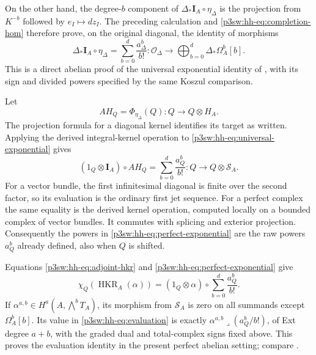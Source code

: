 \documentclass[11pt]{article}
\numberwithin{equation}{section}
\begin{document}
On the other hand, the degree-\(b\) component of
\(\Delta_*\mathbf I_A\circ\eta_\Delta\) is the projection from
\(K^{-b}\) followed by \(e_I\mapsto dz_I\).  The preceding
calculation and \eqref{p3sw:hh-eq:completion-hom} therefore prove,
on the original diagonal, the identity of morphisms
\begin{equation}
 \Delta_*\mathbf I_A\circ\eta_\Delta
    =\sum_{b=0}^d\frac{a_\Delta^b}{b!}:
       \mathcal O_\Delta\longrightarrow
                   \bigoplus_{b=0}^d\Delta_*\Omega_A^b[b].
\label{p3sw:hh-eq:universal-exponential}
\end{equation}
This is a direct abelian proof of the universal exponential identity
of \cite[Proposition~4.4]{P3HHCaldararuII}, with its sign and divided
powers specified by the same Koszul comparison.

Let
\[
 AH_Q=\Phi_{\eta_\Delta}(Q):Q\longrightarrow Q\otimes H_A .
\]
The projection formula for a diagonal kernel identifies its target
as written.  Applying the derived integral-kernel operation to
\eqref{p3sw:hh-eq:universal-exponential} gives
\begin{equation}
 (1_Q\otimes\mathbf I_A)\circ AH_Q
      =\sum_{b=0}^d\frac{a_Q^b}{b!}
          :Q\longrightarrow Q\otimes\mathcal S_A .
\label{p3sw:hh-eq:perfect-exponential}
\end{equation}
For a vector bundle, the first infinitesimal diagonal is finite over
the second factor, so its evaluation is the ordinary first jet
sequence.  For a perfect complex the same equality is the derived
kernel operation, computed locally on a bounded complex of vector
bundles.  It commutes with splicing and exterior projection.
Consequently the powers in
\eqref{p3sw:hh-eq:perfect-exponential} are the raw powers \(a_Q^b\)
already defined, also when \(Q\) is shifted.

Equations
\eqref{p3sw:hh-eq:adjoint-hkr} and
\eqref{p3sw:hh-eq:perfect-exponential} give
\begin{equation}
 \chi_Q(\operatorname{HKR}_A(\alpha))
       =(1_Q\otimes\alpha)\circ
                          \sum_{b=0}^d\frac{a_Q^b}{b!}.
\label{p3sw:hh-eq:evaluation}
\end{equation}
If \(\alpha^{a,b}\in H^a(A,\bigwedge^bT_A)\), its morphism from
\(\mathcal S_A\) is zero on all summands except \(\Omega_A^b[b]\).
Its value in \eqref{p3sw:hh-eq:evaluation} is exactly
\(\alpha^{a,b}\mathbin{\lrcorner}(a_Q^b/b!)\), of Ext degree \(a+b\),
with the graded dual and total-complex signs fixed above.  This proves
the evaluation identity in the present perfect abelian setting;
compare \cite[Theorem~A]{P3HHHuang}.
\end{document}
